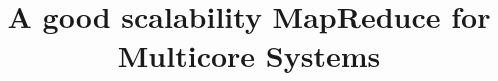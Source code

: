 \documentclass[preprint,10pt]{sigplanconf}
\title{\vspace{-5pt} A good scalability MapReduce for Multicore Systems\\
  
	\vspace{-5pt}}
\begin{document}
\maketitle


%







\begin{small}


%
\end{small}
\end{document}
